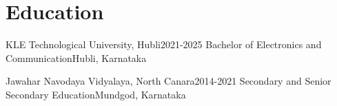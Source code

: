 \section{Education}
\resumeSubHeadingListStart

\resumeSubheading
{KLE Technological University, Hubli}{2021-2025}
{Bachelor of Electronics and Communication}{Hubli, Karnataka}
\resumeItemListStart
\resumeItemListEnd

\resumeSubheading
{Jawahar Navodaya Vidyalaya, North Canara}{2014-2021}
{Secondary and Senior Secondary Education}{Mundgod, Karnataka}
\resumeItemListStart
\resumeItemListEnd

\resumeSubHeadingListEnd
